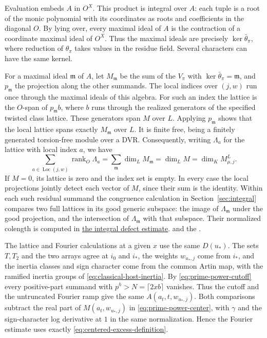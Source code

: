Evaluation embeds \(A\) in \(O^X\). This product is integral
over \(A\): each tuple is a root of the monic polynomial with its
coordinates as roots and coefficients in the diagonal \(O\).
By lying over, every maximal ideal of \(A\) is the contraction
of a coordinate maximal ideal of \(O^X\). Thus the maximal
ideals are precisely \(\ker\bar\theta_\pi\), where reduction of
\(\theta_\pi\) takes values in the residue field. Several characters
can have the same kernel.

For a maximal ideal \(\mathfrak m\) of \(A\), let \(M_{\mathfrak m}\)
be the sum of the \(V_\pi\) with \(\ker\bar\theta_\pi=\mathfrak m\), and
\(p_{\mathfrak m}\) the projection along the other summands. The
local indices over \((j,w)\) run once through the maximal ideals of
this algebra. For such an index the lattice is the \(O\)-span of
\(p_{\mathfrak m}b\), where \(b\) runs through the realized generators
of the specified twisted class lattice. These generators span \(M\)
over \(L\). Applying \(p_{\mathfrak m}\) shows that the local
lattice spans exactly \(M_{\mathfrak m}\) over \(L\). It is finite
free, being a finitely generated torsion-free module over a DVR.
Consequently, writing \(\Lambda_a\) for the lattice with local
index \(a\), we have
\begin{equation}
 \label{eq:record-local-rank-sum}
 \sum_{a\in\operatorname{Loc}(j,w)}\operatorname{rank}_O\Lambda_a
   =\sum_{\mathfrak m}\dim_L M_{\mathfrak m}
   =\dim_L M=\dim_K M^L_{\mu,j}.
\end{equation}
If \(M=0\), its lattice is zero and the index set is empty.
In every case the local projections jointly detect each vector of
\(M\), since their sum is the identity. Within each such residual
summand the congruence calculation in Section~\ref{sec:integral}
compares two full lattices in its good generic subspace:
the image of \(\Lambda_{\mathfrak m}\) under the good projection,
and the intersection of \(\Lambda_{\mathfrak m}\) with that
subspace. Their normalized colength is computed in
\hyperlink{proof.local-hecke-defects}{the integral defect estimate}.
 and the
.

The lattice and Fourier calculations at a given \(x\) use the same
\(D(u_*)\). The sets \(T,T_2\) and the two arrays agree at \(i_0\)
and \(i_*\), the weights \(w_{u_*,j}\) come from \(i_*\), and the
inertia classes and sign character come from the common Artin map,
with the ramified inertia groups of
\eqref{eq:classical-host-inertia}. By
\eqref{eq:prime-power-cutoff} every positive-part summand with
\(p^h>N=\lceil2xb\rceil\) vanishes. Thus the cutoff and the
untruncated Fourier ramp give the same \(A(a_t,t,w_{u_*,j})\).
Both comparisons subtract the real part of \(M(a_t,w_{u_*,j})\) in
\eqref{eq:prime-power-center}, with \(\gamma\) and the sign-character
log derivative at \(1\) in the same normalization. Hence the Fourier
estimate uses exactly \eqref{eq:centered-excess-definition}.

